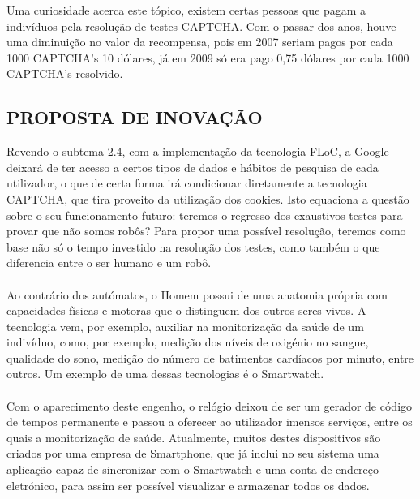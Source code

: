 \documentclass{article}
\begin{document}
	Uma curiosidade acerca este tópico, existem certas pessoas que pagam a indivíduos pela resolução de testes CAPTCHA. Com o passar dos anos, houve uma diminuição no valor da recompensa, pois em 2007 seriam pagos por cada 1000 CAPTCHA's 10 dólares, já em 2009 só era pago 0,75 dólares por cada 1000 CAPTCHA's resolvido\cite{10}.
	
\subsection{PROPOSTA DE INOVAÇÃO}

	Revendo o subtema 2.4, com a implementação da tecnologia FLoC, a Google deixará de ter acesso a certos tipos de dados e hábitos de pesquisa de cada utilizador, o que de certa forma irá condicionar diretamente a tecnologia CAPTCHA, que tira proveito da utilização dos cookies. Isto equaciona a questão sobre o seu funcionamento futuro: teremos o regresso dos exaustivos testes para provar que não somos robôs? Para propor uma possível resolução, teremos como base não só o tempo investido na resolução dos testes, como também o que diferencia entre o ser humano e um robô.  
	


	\paragraph{}Ao contrário dos autómatos, o Homem possui de uma anatomia própria com capacidades físicas e motoras que o distinguem dos outros seres vivos. A tecnologia vem, por exemplo, auxiliar na monitorização da saúde de um indivíduo, como, por exemplo, medição dos níveis de oxigénio no sangue, qualidade do sono, medição do número de batimentos cardíacos por minuto, entre outros. Um exemplo de uma dessas tecnologias é o Smartwatch. 



	\paragraph{}Com o aparecimento deste engenho, o relógio deixou de ser um gerador de código de tempos permanente e passou a oferecer ao utilizador imensos serviços, entre os quais a monitorização de saúde. Atualmente, muitos destes dispositivos são criados por uma empresa de Smartphone, que já inclui no seu sistema uma aplicação capaz de sincronizar com o Smartwatch e uma conta de endereço eletrónico, para assim ser possível visualizar e armazenar todos os dados.\newline
\end{document}
